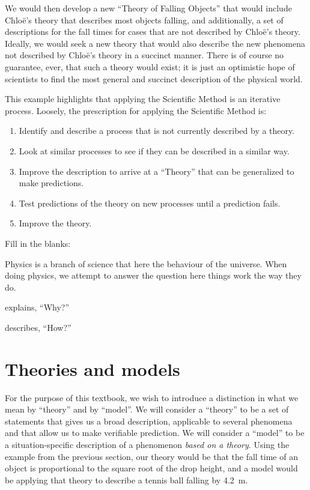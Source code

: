 We would then develop a new ``Theory of Falling Objects'' that would include Chlo\"e's theory that describes most objects falling, and additionally, a set of descriptions for the fall times for cases that are not described by Chlo\"e's theory. Ideally, we would seek a new theory that would also describe the new phenomena not described by Chlo\"e's theory in a succinct manner. There is of course no guarantee, ever, that such a theory would exist; it is just an optimistic hope of scientists to find the most general and succinct description of the physical world. 

This example highlights that applying the Scientific Method is an iterative process. Loosely, the prescription for applying the Scientific Method is:
\begin{enumerate}
\item Identify and describe a process that is not currently described by a theory.
\item Look at similar processes to see if they can be described in a similar way.
\item Improve the description to arrive at a ``Theory'' that can be generalized to make predictions.
\item Test predictions of the theory on new processes until a prediction fails.
\item Improve the theory.
\end{enumerate}

\begin{checkpointMC}{Fill in the blanks:

Physics is a branch of science that here the behaviour of the universe. When doing physics, we attempt to answer the question here things work the way they do.}
\item explains, ``Why?''
\item describes, ``How?''
\end{checkpointMC}

\section{Theories and models}
For the purpose of this textbook, we wish to introduce a distinction in what we mean by ``theory'' and by ``model''. We will consider a ``theory'' to be a set of statements that gives us a broad description, applicable to several phenomena and that allow us to make verifiable prediction. We will consider a ``model'' to be a situation-specific description of a phenomenon \textit{based on a theory}. Using the example from the previous section, our theory would be that the fall time of an object is proportional to the square root of the drop height, and a model would be applying that theory to describe a tennis ball falling by \SI{4.2}{\meter}.

